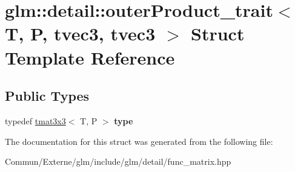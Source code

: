 \hypertarget{structglm_1_1detail_1_1outer_product__trait_3_01_t_00_01_p_00_01tvec3_00_01tvec3_01_4}{}\section{glm\+:\+:detail\+:\+:outer\+Product\+\_\+trait$<$ T, P, tvec3, tvec3 $>$ Struct Template Reference}
\label{structglm_1_1detail_1_1outer_product__trait_3_01_t_00_01_p_00_01tvec3_00_01tvec3_01_4}
\subsection*{Public Types}
\begin{DoxyCompactItemize}
\item 
typedef \hyperlink{structglm_1_1detail_1_1tmat3x3}{tmat3x3}$<$ T, P $>$ {\bfseries type}\hypertarget{structglm_1_1detail_1_1outer_product__trait_3_01_t_00_01_p_00_01tvec3_00_01tvec3_01_4_ac6a4ba81935840a9b4e4603f0bc0e222}{}\label{structglm_1_1detail_1_1outer_product__trait_3_01_t_00_01_p_00_01tvec3_00_01tvec3_01_4_ac6a4ba81935840a9b4e4603f0bc0e222}

\end{DoxyCompactItemize}


The documentation for this struct was generated from the following file\+:\begin{DoxyCompactItemize}
\item 
Commun/\+Externe/glm/include/glm/detail/func\+\_\+matrix.\+hpp\end{DoxyCompactItemize}
